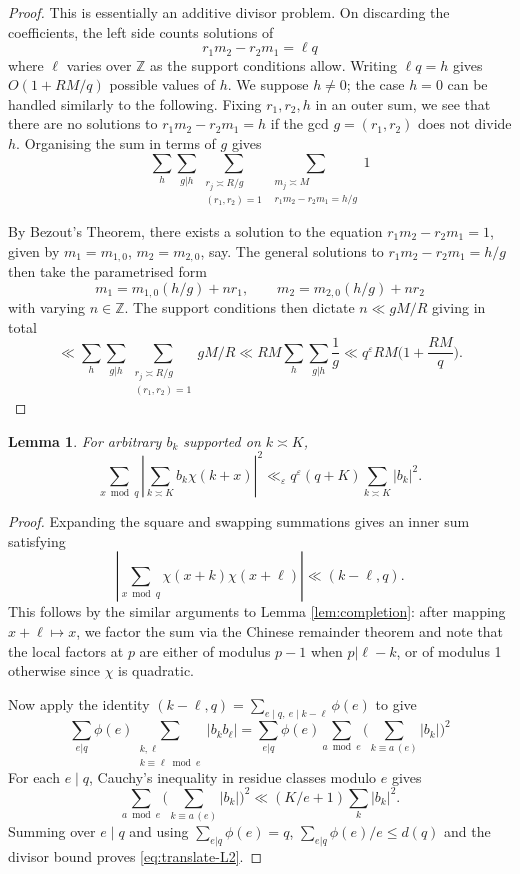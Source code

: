 \documentclass[12pt, oneside]{amsart}
\newtheorem{lem}[prop]{Lemma}
\theoremstyle{definition}
\newcommand{\mb}{\mathbb}
\newcommand{\leqs}{\leqslant }
\newcommand{\eps}{\varepsilon}
\newcommand{\1}{\mathds{1}}
\begin{document}
\begin{proof}
This is essentially an additive divisor problem. On discarding the coefficients, the left side counts solutions of
\begin{equation*}
 r_1m_2-r_2m_1=\ell q
\end{equation*}
where $\ell$ varies over $\mb{Z}$ as the support conditions allow.
Writing $\ell q =h$ gives $O(1+RM/q)$ possible values of $h$. We suppose $h\neq 0$; the case $h=0$ can be handled similarly to the following. Fixing $r_1,r_2,h$ in an outer sum, we see that there are no solutions to $ r_1m_2-r_2m_1=h$ if the gcd $g=(r_1,r_2)$ does not divide $h$. Organising the sum in terms of $g$ gives
\[
\sum_h\sum_{g|h}\sum_{\substack{r_j\asymp R/g\\ (r_1,r_2)=1}}\sum_{\substack{m_j\asymp M\\r_1m_2-r_2m_1=h/g}}1
\]

By Bezout's Theorem, there exists a solution to the equation $r_1m_2-r_2m_1=1$, given by $m_1=m_{1,0}$, $m_2=m_{2,0}$, say. The general solutions to $r_1m_2-r_2m_1=h/g$ then take the parametrised form 
\[
m_1=m_{1,0}(h/g)+nr_1,\qquad m_2=m_{2,0}(h/g)+nr_2
\] 
with varying $n\in\mb{Z}$. The support conditions then dictate $n\ll gM/R$ giving in total
\[
\ll \sum_h\sum_{g|h}\sum_{\substack{r_j\asymp R/g\\ (r_1,r_2)=1}}gM/R
\ll RM \sum_h\sum_{g|h}\frac{1}{g}
\ll q^\eps RM\Big(1+\frac{RM}{q}\Big).
\]
\end{proof}


\begin{lem}
\label{lem:translate-L2}
For arbitrary $b_k$ supported on $k\asymp K$,
\begin{equation}
 \sum_{x\bmod q}
 \left|\sum_{k\asymp K}b_k\chi(k+x)\right|^2
 \ll_\eps q^\eps(q+K)\sum_{k\asymp K}|b_k|^2.
 \label{eq:translate-L2}
\end{equation}
\end{lem}

\begin{proof}
Expanding the square and swapping summations gives an inner sum satisfying 
\[
 \left|\sum_{x\bmod q}\chi(x+k)\chi(x+\ell)\right|
 \ll (k-\ell,q).
\]
This follows by the similar arguments to Lemma \ref{lem:completion}: after mapping $x+\ell\mapsto x$, we factor the sum via the Chinese remainder theorem and note that the local factors at $p$ are either of modulus $p-1$ when $p|\ell-k$, or of modulus 1 otherwise since $\chi$ is quadratic.  

Now apply the identity 
$(k-\ell,q)=\sum_{e\mid q,\ e\mid k-\ell}\phi(e)$ to give 
\[
\sum_{e|q}\phi(e)\sum_{\substack{k,\ell\\k\equiv \ell\bmod e}}|b_kb_\ell|
=
\sum_{e|q}\phi(e) \sum_{a\bmod e}\bigg(\sum_{k\equiv a\,(e)}|b_k|\bigg)^2
\]
  For each $e\mid q$, Cauchy's
inequality in residue classes modulo $e$ gives
\[
 \sum_{a\bmod e}\bigg(\sum_{k\equiv a\,(e)}|b_k|\bigg)^2
 \ll (K/e+1)\sum_k|b_k|^2.
\]
Summing over $e\mid q$ and using $\sum_{e|q}\phi(e)=q$, $\sum_{e|q}\phi(e)/e\leqs d(q)$ and the divisor bound proves \eqref{eq:translate-L2}.
\end{proof}
\end{document}
